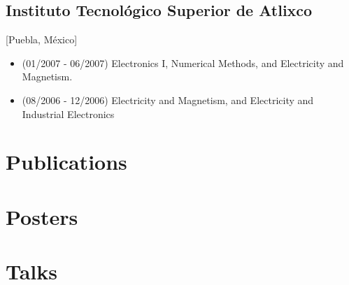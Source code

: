 \documentclass{mycv}
\begin{document}
\subsection{Instituto Tecnol\'ogico Superior de Atlixco}[Puebla, M\'exico]
\begin{positions}
\end{positions}
\begin{itemize}
	\item (01/2007 - 06/2007) Electronics I, Numerical Methods, and Electricity and Magnetism. 
	\item (08/2006 - 12/2006) Electricity and Magnetism, and Electricity and Industrial Electronics 
\end{itemize}

\section{Publications}

\section{Posters}

\section{Talks}
\end{document}
